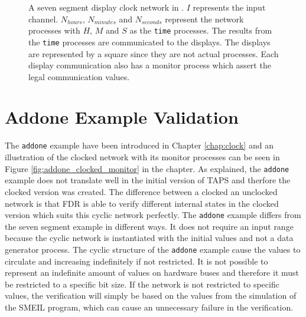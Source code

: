 \begin{figure}[!ht]
  \caption{A seven segment display clock network in \cspm{}. $I$ represents the input channel. $N_{hours}$, $N_{minutes}$ and $N_{seconds}$ represent the network processes with $H$, $M$ and $S$ as the \texttt{time} processes. The results from the \texttt{time} processes are communicated to the displays. The displays are represented by a square since they are not actual \cspm{} processes. Each display communication also has a monitor process which assert the legal communication values.}
  \label{fig:cspm-network}
\end{figure}


\section{Addone Example Validation}
The \texttt{addone} example have been introduced in Chapter \ref{chap:clock} and an illustration of the clocked network with its monitor processes can be seen in Figure \ref{fig:addone_clocked_monitor} in the chapter. As explained, the \texttt{addone} example does not translate well in the initial version of TAPS and therfore the clocked version was created.
The difference between a clocked an unclocked network is that FDR is able to verify different internal states in the clocked version which suits this cyclic network perfectly.
The \texttt{addone} example differs from the seven segment example in different ways. It does not require an input range because the cyclic network is instantiated with the initial values and not a data generator process. The cyclic structure of the \texttt{addone} example cause the values to circulate and increasing indefinitely if not restricted. It is not possible to represent an indefinite amount of values on hardware buses and therefore it must be restricted to a specific bit size. If the network is not restricted to specific values, the verification will simply be based on the values from the simulation of the SMEIL program, which can cause an unnecessary failure in the verification. \\

